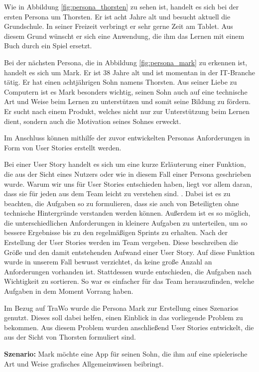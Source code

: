 Wie in Abbildung \ref{fig:persona_thorsten} zu sehen ist, handelt es sich bei der ersten Persona um Thorsten. Er ist acht Jahre alt und besucht aktuell die Grundschule. In seiner Freizeit verbringt er sehr gerne Zeit am Tablet. Aus diesem Grund wünscht er sich eine Anwendung, die ihm das Lernen mit einem Buch durch ein Spiel ersetzt.

Bei der nächsten Persona, die in Abbildung \ref{fig:persona_mark} zu erkennen ist, handelt es sich um Mark. Er ist 38 Jahre alt und ist momentan in der IT-Branche tätig. Er hat einen achtjährigen Sohn namens Thorsten. Aus seiner Liebe zu Computern ist es Mark besonders wichtig, seinen Sohn auch auf eine technische Art und Weise beim Lernen zu unterstützen und somit seine Bildung zu fördern. Er sucht nach einem Produkt, welches nicht nur zur Unterstützung beim Lernen dient, sondern auch die Motivation seines Sohnes erweckt.

Im Anschluss können mithilfe der zuvor entwickelten Personas Anforderungen in Form von User Stories erstellt werden.

Bei einer User Story handelt es sich um eine kurze Erläuterung einer Funktion, die aus der Sicht eines Nutzers oder wie in diesem Fall einer Persona geschrieben wurde. Warum wir uns für User Stories entschieden haben, liegt vor allem daran, dass sie für jeden aus dem Team leicht zu verstehen sind. . Dabei ist es zu beachten, die Aufgaben so zu formulieren, dass sie auch von Beteiligten ohne technische Hintergründe verstanden werden können. Außerdem ist es so möglich, die unterschiedlichen Anforderungen in kleinere Aufgaben zu unterteilen, um so bessere Ergebnisse bis zu den regelmäßigen Sprints zu erhalten. Nach der Erstellung der User Stories werden im Team  vergeben. Diese beschreiben die Größe und den damit entstehenden Aufwand einer User Story. Auf diese Funktion wurde in unserem Fall bewusst verzichtet, da keine große Anzahl an Anforderungen vorhanden ist. Stattdessen wurde entschieden, die Aufgaben nach Wichtigkeit zu sortieren. So war es einfacher für das Team herauszufinden, welche Aufgaben in dem Moment Vorrang haben. 

Im Bezug auf TraWo wurde die Persona Mark zur Erstellung eines Szenarios genutzt. Dieses soll dabei helfen, einen Einblick in das vorliegende Problem zu bekommen. Aus diesem Problem wurden anschließend User Stories entwickelt, die aus der Sicht von Thorsten formuliert sind.

\textbf{Szenario:}
Mark möchte eine App für seinen Sohn, die ihm auf eine spielerische Art und Weise grafisches Allgemeinwissen beibringt.

